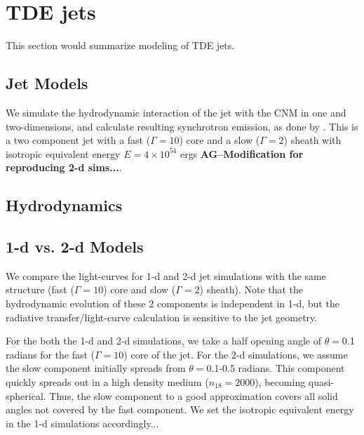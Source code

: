 \documentclass[usenatbib,fleqn]{mnras}
\newcommand{\Mbh}[1][]{M_{\bullet#1}}
\begin{document}


\section{TDE jets}
\label{sec:jet}
This section would summarize modeling of TDE jets.

\subsection{Jet Models}


We simulate the hydrodynamic interaction of the jet with the CNM in
 one and two-dimensions, and calculate resulting synchrotron emission,
 as done by \citet{Mimica+2015}.  This is a two component jet with a fast
 ($\Gamma=10$) core and a slow ($\Gamma=2$) sheath with isotropic
 equivalent energy $E=4 \times 10^{54}$ ergs {\bf AG--Modification for
   reproducing 2-d sims...}.
\subsection{Hydrodynamics}

\subsection{1-d vs. 2-d Models}
\label{sec:2d}
We compare the light-curves for 1-d and 2-d jet simulations with the
same structure (fast ($\Gamma=10$) core and slow ($\Gamma=2$)
sheath). Note that the hydrodynamic evolution of these 2 components is
independent in 1-d, but the radiative transfer/light-curve calculation
is sensitive to the jet geometry.

For the both the 1-d and 2-d simulations, we take a half opening angle
of $\theta=$0.1 radians for the fast ($\Gamma=10$) core of the
jet. For the 2-d simulations, we assume the slow component initially
spreads from $\theta=$0.1-0.5 radians. This component quickly spreads
out in a high density medium ($n_{18}=2000$), becoming
quasi-spherical. Thus, the slow component to a good approximation
covers all solid angles not covered by the fast component. We set the
isotropic equivalent energy in the 1-d simulations accordingly...
\end{document}
